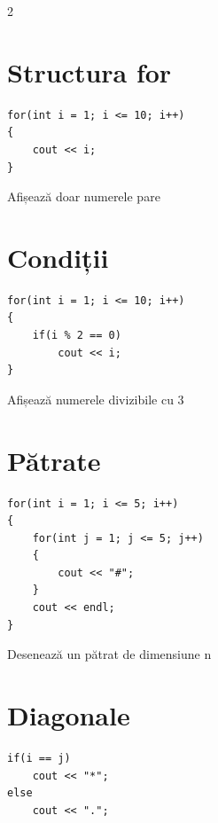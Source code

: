 \documentclass[11pt]{article}
\begin{document}
\begin{multicols}{2}
\section*{Structura for}

\begin{examplebox}
\begin{lstlisting}
for(int i = 1; i <= 10; i++)
{
    cout << i;
}
\end{lstlisting}
\end{examplebox}

\begin{trybox}
Afișează doar numerele pare
\end{trybox}

\section*{Condiții}

\begin{examplebox}
\begin{lstlisting}
for(int i = 1; i <= 10; i++)
{
    if(i % 2 == 0)
        cout << i;
}
\end{lstlisting}
\end{examplebox}

\begin{trybox}
Afișează numerele divizibile cu 3
\end{trybox}

\section*{Pătrate}

\begin{examplebox}
\begin{lstlisting}
for(int i = 1; i <= 5; i++)
{
    for(int j = 1; j <= 5; j++)
    {
        cout << "#";
    }
    cout << endl;
}
\end{lstlisting}
\end{examplebox}

\begin{trybox}
Desenează un pătrat de dimensiune n
\end{trybox}

\section*{Diagonale}

\begin{examplebox}
\begin{lstlisting}
if(i == j)
    cout << "*";
else
    cout << ".";
\end{lstlisting}
\end{examplebox}


\end{multicols}
\end{document}
